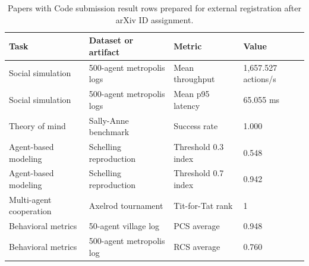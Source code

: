 \begin{table}[h]
\centering
\begin{tabular}{llll}
\toprule
Task & Dataset or artifact & Metric & Value \\
\midrule
Social simulation & 500-agent metropolis logs & Mean throughput & 1,657.527 actions/s \\
Social simulation & 500-agent metropolis logs & Mean p95 latency & 65.055 ms \\
Theory of mind & Sally-Anne benchmark & Success rate & 1.000 \\
Agent-based modeling & Schelling reproduction & Threshold 0.3 index & 0.548 \\
Agent-based modeling & Schelling reproduction & Threshold 0.7 index & 0.942 \\
Multi-agent cooperation & Axelrod tournament & Tit-for-Tat rank & 1 \\
Behavioral metrics & 50-agent village log & PCS average & 0.948 \\
Behavioral metrics & 500-agent metropolis log & RCS average & 0.760 \\
\bottomrule
\end{tabular}
\caption{Papers with Code submission result rows prepared for external registration after arXiv ID assignment.}
\label{tab:papers-with-code-results}
\end{table}
